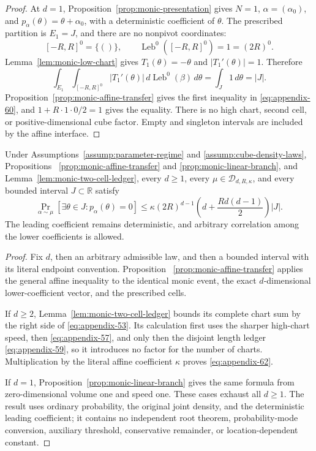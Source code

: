 \begin{proof}
At $d=1$, Proposition~\ref{prop:monic-presentation} gives $N=1$,
$\alpha=(\alpha_0)$, and $p_\alpha(\theta)=\theta+\alpha_0$, with a
deterministic coefficient of $\theta$.  The prescribed partition is
$E_1=J$, and there are no nonpivot coordinates:
\[
[-R,R]^0=\{()\},
\qquad
\operatorname{Leb}^0([-R,R]^0)=1=(2R)^0.
\]
Lemma~\ref{lem:monic-low-chart} gives
$T_1(\theta)=-\theta$ and $|T_1'(\theta)|=1$.  Therefore
\begin{equation}
\int_{E_1}\int_{[-R,R]^0}|T_1'(\theta)|
\,d\operatorname{Leb}^0(\beta)\,d\theta
=\int_J1\,d\theta=|J|.
\label{eq:appendix-61}
\end{equation}
Proposition~\ref{prop:monic-affine-transfer} gives the first inequality in
\eqref{eq:appendix-60}, and $1+R\cdot1\cdot0/2=1$ gives the equality.  There is no high
chart, second cell, or positive-dimensional cube factor.  Empty and
singleton intervals are included by the affine interface.
\end{proof}

\begin{proposition}
\label{prop:monic-probability}
Under Assumptions~\ref{assump:parameter-regime} and
\ref{assump:cube-density-laws}, Propositions
~\ref{prop:monic-affine-transfer} and
\ref{prop:monic-linear-branch}, and
Lemma~\ref{lem:monic-two-cell-ledger}, every $d\geq1$, every
$\mu\in\mathcal D_{d,R,\kappa}$, and every bounded interval
$J\subset\mathbb R$ satisfy
\begin{equation}
\Pr_{\alpha\sim\mu}
[\exists\theta\in J:p_\alpha(\theta)=0]
\leq\kappa(2R)^{d-1}
\left(d+\frac{Rd(d-1)}2\right)|J|.
\label{eq:appendix-62}
\end{equation}
The leading coefficient remains deterministic, and arbitrary correlation
among the lower coefficients is allowed.
\end{proposition}

\begin{proof}
Fix $d$, then an arbitrary admissible law, and then a bounded interval with
its literal endpoint convention.  Proposition
~\ref{prop:monic-affine-transfer} applies the general affine inequality to
the identical monic event, the exact $d$-dimensional lower-coefficient
vector, and the prescribed cells.

If $d\geq2$, Lemma~\ref{lem:monic-two-cell-ledger} bounds its complete chart
sum by the right side of \eqref{eq:appendix-53}.  Its calculation first uses the sharper
high-chart speed, then \eqref{eq:appendix-57}, and only then the disjoint length ledger
\eqref{eq:appendix-59}, so it introduces no factor for the number of charts.  Multiplication
by the literal affine coefficient $\kappa$ proves \eqref{eq:appendix-62}.

If $d=1$, Proposition~\ref{prop:monic-linear-branch} gives the same formula
from zero-dimensional volume one and speed one.  These cases exhaust all
$d\geq1$.  The result uses ordinary probability, the original joint density,
and the deterministic leading coefficient; it contains no independent root
theorem, probability-mode conversion, auxiliary threshold, conservative
remainder, or location-dependent constant.
\end{proof}

